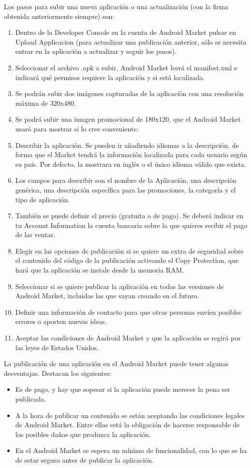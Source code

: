 \documentclass[12 pt, a4paper, twoside]{article}
\begin{document}
Los pasos para subir una nueva aplicación o una actualización (con la firma
obtenida anteriormente siempre) son:
\begin{enumerate}
\item Dentro de la Developer Console en la cuenta de Android Market pulsar
en Upload Applicacion (para actualizar una publicación anterior, sólo se
necesita entrar en la aplicación a actualizar y seguir los pasos).
\item Seleccionar el archivo .apk a subir, Android Market leerá el manifest.xml e
indicará qué permisos requiere la aplicación y si está localizada.
\item Se podrán subir dos imágenes capturadas de la aplicación con una resolución
máxima de 320x480.
\item Se podrá subir una imagen promocional de 180x120, que el Android Market
usará para mostrar si lo cree conveniente.
\item Describir la aplicación. Se pueden ir añadiendo idiomas a la descripción,
de forma que el Market tendrá la información localizada para cada usuario
según su país. Por defecto, la mostrara en inglés o el único idioma válido
que exista.
\item Los campos para describir son el nombre de la Aplicación, una descripción
genérica, una descripción específica para las promociones, la categoría y el
tipo de aplicación.
\item También se puede definir el precio (gratuita o de pago). Se deberá indicar
en tu Account Information la cuenta bancaria sobre la que quieres recibir el
pago de las ventas.
\item Elegir en las opciones de publicación si se quiere un extra de seguridad sobre
el contenido del código de la publicación activando el Copy Protection, que
hará que la aplicación se instale desde la memoria RAM.
\item Seleccionar si se quiere publicar la aplicación en todas las versiones de
Android Market, incluidas las que vayan creando en el futuro.
\item Definir una información de contacto para que otras personas envíen posibles
errores o aporten nuevas ideas.
\item Aceptar las condiciones de Android Market y que la aplicación se regirá por
las leyes de Estados Unidos.
\end{enumerate}

La publicación de una aplicación en el Android Market puede tener algunas
desventajas. Destacan los siguientes:
\begin{itemize}
\item Es de pago, y hay que sopesar si la aplicación puede merecer la pena ser
publicada.
\item A la hora de publicar un contenido se están aceptando las condiciones legales
de Android Market. Entre ellas está la obligación de hacerse responsable de
los posibles daños que produzca la aplicación.
\item En el Android Market se espera un mínimo de funcionalidad, con lo que se
ha de estar seguro antes de publicar la aplicación.
\end{itemize}
\end{document}
